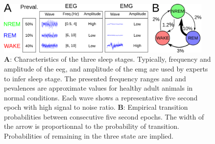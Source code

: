 
\begin{figure}[h!]

  \centering    
    \includegraphics[width=0.95\textwidth]{figures/sleep_description.pdf}
  \caption{
  \textbf{A}: Characteristics of the three sleep stages.
  Typically, frequency and amplitude of the \acrfull{eeg}, and amplitude of the \acrfull{emg} are used by experts to infer sleep stage.
  The presented frequency ranges and and pevalences are approximate values for healthy adult animals in normal conditions.
  Each wave shows a representative five second epoch with high signal to noise ratio.
  \textbf{B}: Empirical transition probabilities between consecutive five second epochs. The width of the arrow is proportionnal to the probability of transition.
  Probabilities of remaining in the three state are implied.
  \label{fig:sleep_description}
  }
           
\end{figure}
